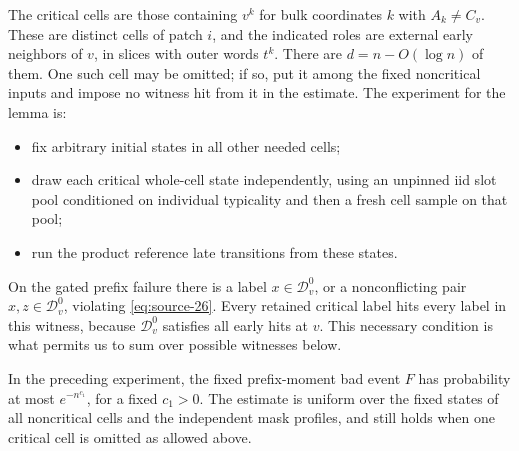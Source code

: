 The critical cells are those containing \(v^k\) for bulk coordinates
\(k\) with \(A_k\ne C_v\). These are distinct cells of patch \(i\),
and the indicated roles are external early neighbors of \(v\), in
slices with outer words \(t^k\). There are \(d=n-O(\log n)\) of
them. One such cell may be omitted; if so, put it among the fixed
noncritical inputs and impose no witness hit from it in the estimate.
The experiment for the lemma is:
\begin{itemize}
\item fix arbitrary initial states in all other needed cells;
\item draw each critical whole-cell state independently, using an
unpinned iid slot pool conditioned on individual typicality and then a
fresh cell sample on that pool;
\item run the product reference late transitions from these states.
\end{itemize}
On the gated prefix failure there is a label \(x\in\mathcal D_v^0\),
or a nonconflicting pair \(x,z\in\mathcal D_v^0\), violating
\eqref{eq:source-26}. Every retained critical label hits every label
in this witness, because \(\mathcal D_v^0\) satisfies all early hits
at \(v\). This necessary condition is what permits us to sum over
possible witnesses below.

\begin{lemma}\label{lem:late-prefix-transfer}
In the preceding experiment, the fixed prefix-moment bad event \(F\) has probability at most \(e^{-n^{c_1}}\), for a fixed \(c_1>0\). The estimate is uniform over the fixed states of all noncritical cells and the independent mask profiles, and still holds when one critical cell is omitted as allowed above.
\end{lemma}

